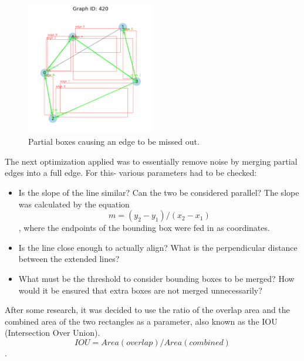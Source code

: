 \documentclass{article}
\begin{document}
\begin{figure}[h!]
    \centering
    \includegraphics[width=0.5\textwidth]{420.png}
    \caption{Partial boxes causing an edge to be missed out.}
    \label{fig:example}
\end{figure}

The next optimization applied was to essentially remove noise by merging partial edges into a full edge. For this- various parameters had to be checked:

\begin{itemize}
    \item Is the slope of the line similar? Can the two be considered parallel? The slope was calculated by the equation $$m = (y_2 - y_1)/(x_2 - x_1)$$, where the endpoints of the bounding box were fed in as coordinates.
    \item Is the line close enough to actually align? What is the perpendicular distance between the extended lines?
    \item What must be the threshold to consider bounding boxes to be merged? How would it be ensured that extra boxes are not merged unnecessarily?
\end{itemize}

After some research, it was decided to use the ratio of the overlap area and the combined area of the two rectangles as a parameter, also known as the IOU (Intersection Over Union). $$IOU = Area(overlap)/Area(combined)$$.
\end{document}
